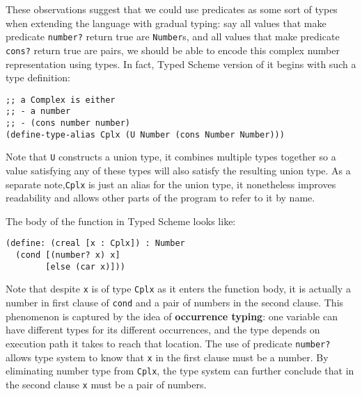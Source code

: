 
These observations suggest that we could use predicates as some sort of types
when extending the language with gradual typing: say all values that make predicate \texttt{number?}
return true are \texttt{Number}s, and all values that make predicate \texttt{cons?} return true
are pairs, we should be able to encode this complex number representation using types.
In fact, Typed Scheme version of it begins with such a type definition:



\begin{verbatim}
;; a Complex is either
;; - a number
;; - (cons number number)
(define-type-alias Cplx (U Number (cons Number Number)))
\end{verbatim}

Note that \texttt{U} constructs a union type, it combines multiple types together so
a value satisfying any of these types will also satisfy the resulting union type.
As a separate note,\texttt{Cplx} is just an alias for the union type,
it nonetheless improves readability
and allows other parts of the program to refer to it by name.

The body of the function in Typed Scheme looks like:

\begin{verbatim}
(define: (creal [x : Cplx]) : Number
  (cond [(number? x) x]
        [else (car x)]))
\end{verbatim}


Note that despite \texttt{x} is of type \texttt{Cplx} as it enters the function body,
it is actually a number in first clause of \texttt{cond} and a pair of numbers
in the second clause. This phenomenon is captured by the idea of
\textbf{occurrence typing}: one variable can have different types
for its different occurrences, and the type depends on execution path it takes to reach that location.
The use of predicate \texttt{number?} allows type system to know that \texttt{x}
in the first clause must be a number. By eliminating number type from \texttt{Cplx},
the type system can further conclude that in the second clause \texttt{x} must be a pair of numbers.

